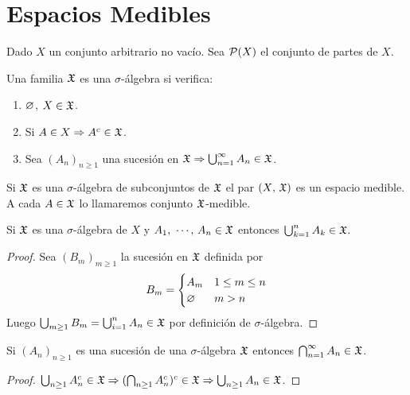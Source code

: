 \clearpage

\section{Espacios Medibles}

Dado $X$ un conjunto arbitrario no vacío. Sea $\mathcal{P}(X)$ el conjunto de partes de $X$.

\begin{definition}
    Una familia $\mathfrak{X}$ es una $\sigma$-álgebra si verifica:
    \begin{enumerate}
        \item $\varnothing$, $X \in \mathfrak{X}$.
        \item Si $A \in X \Rightarrow A^c \in \mathfrak{X}$.
        \item Sea $(A_n)_{n \geq 1}$ una sucesión en $\mathfrak{X} \Rightarrow \bigcup_{n=1}^{\infty} A_n \in \mathfrak{X}$.
    \end{enumerate}
\end{definition}

\begin{definition}
    Si $\mathfrak{X}$ es una $\sigma$-álgebra de subconjuntos de $\mathfrak{X}$ el par $(X\text{, }\mathfrak{X})$ es un espacio medible. A cada $A \in \mathfrak{X}$
    lo llamaremos conjunto $\mathfrak{X}$-medible.
\end{definition}

\begin{note}
    Si $\mathfrak{X}$ es una $\sigma$-álgebra de $X$ y $A_1 \text{, } \cdots \text{, } A_n \in \mathfrak{X}$ entonces $\bigcup_{k=1}^{n} A_k \in \mathfrak{X}$.
    \begin{proof}
        Sea $(B_m)_{m \geq 1}$ la sucesión en $\mathfrak{X}$ definida por \begin{equation*}
            B_m = \begin{cases}
                A_m & 1 \leq m \leq n \\
                \varnothing  & m > n
            \end{cases}
        \end{equation*}
        Luego $\bigcup_{m \geq 1} B_m = \bigcup_{i = 1}^n A_n \in \mathfrak{X}$ por definición de $\sigma$-álgebra.
    \end{proof}
\end{note}

\begin{note}
    Si $(A_n)_{n \geq 1}$ es una sucesión de una $\sigma$-álgebra $\mathfrak{X}$ entonces $\bigcap_{n=1}^{\infty} A_n \in \mathfrak{X}$.
    \begin{proof}
        $\bigcup_{n \geq 1} A_n^c \in \mathfrak{X} \Rightarrow (\bigcap_{n \geq 1} A_n^c)^c \in \mathfrak{X} \Rightarrow \bigcup_{n \geq 1} A_n \in \mathfrak{X}$.
    \end{proof}
\end{note}

